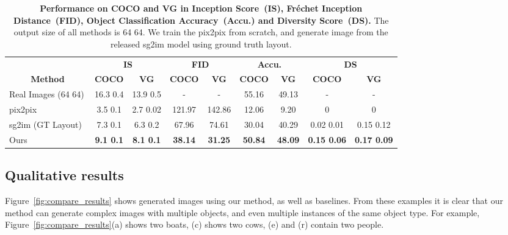 \documentclass[10pt,twocolumn,letterpaper]{article}
\begin{document}
\begin{table*}[!th]
\centering
\begin{tabular}{l|cc|cc|cc|cc}
                                     & \multicolumn{2}{c|}{\textbf{IS}} & \multicolumn{2}{c|}{\textbf{FID}}         & \multicolumn{2}{c|}{\textbf{Accu.}} & \multicolumn{2}{c}{\textbf{DS}}             \\
\multicolumn{1}{c|}{\textbf{Method}} & \textbf{COCO}          & \textbf{VG}            & \textbf{COCO}      & \textbf{VG}       & \textbf{COCO}            & \textbf{VG}  & \textbf{COCO}            & \textbf{VG}            \\ \hline
Real Images (64  64)         & 16.3  0.4         & 13.9  0.5   & - & -     & 55.16              & 49.13             & -                        & -                        \\ \hline
pix2pix~\cite{isola2017image}                              & 3.5  0.1          & 2.7  0.02  & 121.97 & 142.86  & 12.06              & 9.20              & 0          & 0 \\
sg2im (GT Layout)~\cite{Johnson2018}                    & 7.3  0.1          & 6.3  0.2   & 67.96 & 74.61   & 30.04              & 40.29             & 0.02  0.01          & 0.15  0.12          \\ \hline
Ours                                 & \textbf{9.1  0.1} & \textbf{8.1  0.1} & \textbf{38.14} & \textbf{31.25} & \textbf{50.84}     & \textbf{48.09}    & \textbf{0.15  0.06} & \textbf{0.17  0.09}         
\end{tabular}
\vspace{0.1in}
\caption{\textbf{Performance on COCO and VG in Inception Score~(IS), Fr\'echet Inception Distance~(FID), Object Classification Accuracy~(Accu.) and Diversity Score~(DS).} The output size of all methods is 64  64. We train the pix2pix from scratch, and generate image from the released sg2im model using ground truth layout.}
\vspace{-0.2in}
\label{tb:quantitative_results}
\end{table*}

\subsection{Qualitative results}
Figure~\ref{fig:compare_results} shows generated images using our method, as well as baselines. From these examples it is clear that our method can generate complex images with multiple objects, and even multiple instances of the same object type. For example, Figure~\ref{fig:compare_results}(a) shows two boats, (c) shows two cows, (e) and (r) contain two people.
\end{document}
